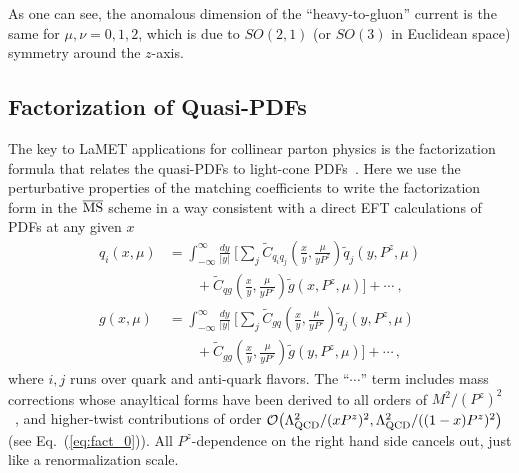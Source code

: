 \documentclass[aps,rmp,reprint,amsmath,amssymb,graphicx,longbibliography]{revtex4-1} %
\newcommand{\MS}{{\overline{\rm MS}}}
\newcommand{\nn}{\nonumber}
\DeclareRobustCommand{\eq}[1]{Eq.~(\ref{eq:#1})}
\begin{document}
As one can see, the anomalous dimension of the ``heavy-to-gluon'' current is the same for $\mu,\nu=0,1,2$, which is due to $SO(2,1)$ (or  $SO(3)$ in Euclidean space) symmetry around the $z$-axis.

\subsection{Factorization of Quasi-PDFs}
\label{sec:factorization}


The key to LaMET applications for collinear parton physics
is the factorization formula that relates the quasi-PDFs
to light-cone PDFs~\cite{Ji:2013dva}. Here we use the perturbative properties
of the matching coefficients to write the factorization form
in the $\MS$ scheme in a way consistent with a direct EFT calculations
of PDFs at any given $x$~\cite{Izubuchi:2018srq,Wang:2019tgg}
\begin{align}
	q_i(x,  \mu)\! &=\! \int_{-\infty}^{\infty} \frac{dy}{|y|} \ \bigg[\!\sum_j \tilde C_{q_iq_j}\!\left(\frac{x}{y}, \frac{\mu}{yP^z}\right) \tilde{q}_j(y,P^z,\mu) \label{eq:factorization1} \\
	&\qquad + \tilde C_{qg}\left(\frac{x}{y}, \frac{\mu}{yP^z}\right) \tilde{g}(x,P^z,\mu)\bigg] + \cdots
	\ ,\nn\\
	g(x, \mu)\! &=\! \int_{-\infty}^{\infty} \frac{dy}{|y|} \ \bigg[\!\sum_j \tilde C_{gq}\left(\frac{x}{y}, \frac{\mu}{yP^z}\right) \tilde{q}_j(y,P^z,\mu) \label{eq:factorization2} \\
	&\qquad + \tilde C_{gg}\left(\frac{x}{y}, \frac{\mu}{yP^z}\right) \tilde{g}(y,P^z,\mu)\bigg] + \cdots\,,\nn
\end{align}
where $i,j$ runs over quark and anti-quark flavors.
The ``$\cdots$'' term includes mass corrections whose anayltical forms have been derived to all orders of $M^2/(P^z)^2$~\cite{Chen:2016utp}, and higher-twist contributions of order ${\cal O}\big(\Lambda_{\text{QCD}}^2/ (xP^z)^2,\Lambda_{\text{QCD}}^2/ ((1-x)P^z)^2\big)$ (see \eq{fact_0}). All $P^z$-dependence on the right hand side
cancels out, just like a renormalization scale.
\end{document}
